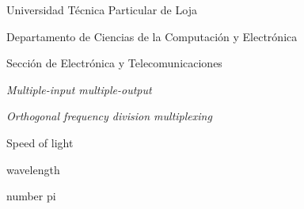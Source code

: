 %
{%
	\item [UTPL] 	Universidad Técnica Particular de Loja 
	\item [DCCE]	Departamento de Ciencias de la Computación y Electrónica 
	\item [SET]		Sección de Electrónica y Telecomunicaciones
	\item [MIMO]	\textit{Multiple-input multiple-output}
	\item [OFDM]	\textit{Orthogonal frequency division multiplexing}	
}
%
%
{%
	\item [$ c $]			Speed of light						
	\item [$ \lambda $]		wavelength
	\item [$ \pi $]			number pi
}